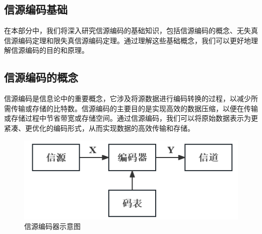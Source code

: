 \begin{multicols}{2}
%
%

%
\section{信源编码基础}
在本部分中，我们将深入研究信源编码的基础知识，包括信源编码的概念、无失真信源编码定理和限失真信源编码定理。通过理解这些基础概念，我们可以更好地理解信源编码的目的和原理。
\subsection{信源编码的概念}
信源编码是信息论中的重要概念，它涉及将源数据进行编码转换的过程，以减少所需传输或存储的比特数。信源编码的主要目的是实现高效的数据压缩，以便在传输或存储过程中节省带宽或存储空间。通过信源编码，我们可以将原始数据表示为更紧凑、更优化的编码形式，从而实现数据的高效传输和存储。

\begin{figure}[H]
	\centering
	\includegraphics[width=0.85\linewidth]{pics/fig1}
	\caption{信源编码器示意图}
	\label{fig:fig1}
\end{figure}


\end{multicols}

